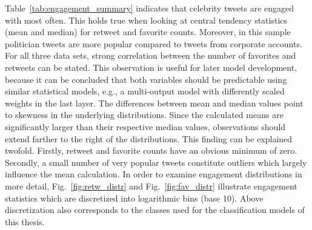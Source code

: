Table~\ref{tab:engagement_summary} indicates that celebrity tweets are engaged
with most often.
This holds true when looking at central tendency statistics (mean and median)
for retweet and favorite counts.
Moreover, in this sample politician tweets are more popular compared to tweets from corporate
accounts.
For all three data sets, strong correlation between the number of favorites and retweets can
be stated.
This observation is useful for later model development, because it can be concluded that
both variables should be predictable using similar statistical models, e.g.,
a multi-output model with differently scaled weights in the last layer.
The differences between mean and median values point to skewness in the
underlying distributions.
Since the calculated means are significantly larger than their respective
median values, observations should extend farther to the right
of the distributions.
This finding can be explained twofold. 
Firstly, retweet and favorite counts have an obvious  minimum of zero.
Secondly, a small number of very popular tweets constitute outliers which largely
influence the mean calculation.
In order to examine engagement distributions in more detail, Fig.~\ref{fig:retw_distr} and
Fig.~\ref{fig:fav_distr} illustrate engagement statistics which are discretized into logarithmic bins (base 10).
Above discretization also corresponds to the classes used for the classification models
of this thesis.

